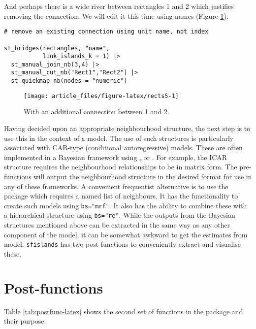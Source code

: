 And perhaps there is a wide river between rectangles 1 and 2 which
justifies removing the connection. We will edit it this time using
names (Figure \ref{fig:rects5}).

\begin{verbatim}
# remove an existing connection using unit name, not index

st_bridges(rectangles, "name", 
           link_islands_k = 1) |> 
  st_manual_join_nb(3,4) |> 
  st_manual_cut_nb("Rect1","Rect2") |> 
  st_quickmap_nb(nodes = "numeric")
\end{verbatim}

\begin{figure}

{\centering \texttt{[image: article\_files/figure-latex/rects5-1]} 

}

\caption{With an additional connection between 1 and 2. }\label{fig:rects5}
\end{figure}

Having decided upon an appropriate neighbourhood structure, the next step is to use this in the context of a model. The use of such structures is particularly associated with CAR-type (conditional autoregressive) models.
These are often implemented in a Bayesian framework using
,  or . For example, the  ICAR structure requires the neighbourhood relationships to be in matrix form. The pre-functions will output the
neighbourhood structure in the desired format for use in any of these
frameworks. A convenient frequentist alternative is to use the
 package which requires a named list of neighbours. It has the functionality to create such models
using \texttt{bs="mrf"}. It also has the ability to combine these with a
hierarchical structure using \texttt{bs="re"}. While the outputs from the
Bayesian structures mentioned above can be extracted in the same way as
any other component of the model, it can be somewhat awkward to get the
estimates from  model. \texttt{sfislands} has two post-functions to conveniently extract and visualise these.

\hypertarget{post-functions}{%
\section{Post-functions}\label{post-functions}}

Table \ref{tab:postfunc-latex} shows the second set of functions in the package and their purpose.

